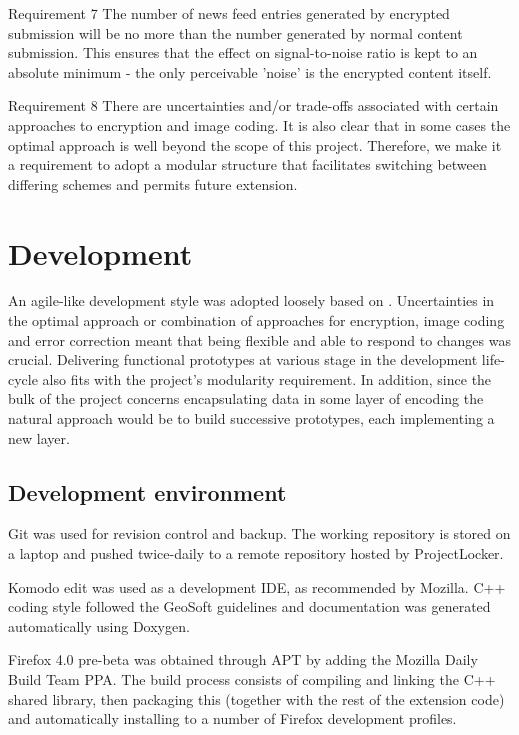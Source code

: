 \begin{desc}
    \item[Requirement 7] The number of news feed entries generated by encrypted submission will be no more than the number generated by normal content submission. This ensures that the effect on signal-to-noise ratio is kept to an absolute minimum - the only perceivable 'noise' is the encrypted content itself.
    

    \item[Requirement 8] There are uncertainties and/or trade-offs associated with certain approaches to encryption and image coding. It is also clear that in some cases the optimal approach is well beyond the scope of this project. Therefore, we make it a requirement to adopt a modular structure that facilitates switching between differing schemes and permits future extension.
    
\end{desc}


   
\FloatBarrier 
\section{Development}
        
An agile-like development style was adopted loosely based on \cite{agile}. Uncertainties in the optimal approach or combination of approaches for encryption, image coding and error correction meant that being flexible and able to respond to changes was crucial. Delivering functional prototypes at various stage in the development life-cycle also fits with the project's modularity requirement. In addition, since the bulk of the project concerns encapsulating data in some layer of encoding the natural approach would be to build successive prototypes, each implementing a new layer.

\subsection{Development environment}

Git was used for revision control and backup. The working repository is stored on a laptop and pushed twice-daily to a remote repository hosted by ProjectLocker.

Komodo edit was used as a development IDE, as recommended by Mozilla. C++ coding style followed the GeoSoft guidelines \cite{code-style} and documentation was generated automatically using Doxygen.

Firefox 4.0 pre-beta was obtained through APT by adding the Mozilla Daily Build Team PPA. The build process consists of compiling and linking the C++ shared library, then packaging this (together with the rest of the extension code) and automatically installing to a number of Firefox development profiles.        

